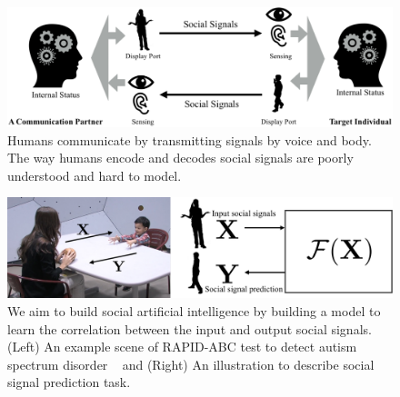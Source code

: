 %
\begin{figure}[t]
	\includegraphics[width=\linewidth]{ssp_fig/socialcomm}
	\caption{Humans communicate by transmitting signals by voice and body. The way humans encode and decodes social signals are poorly understood and hard to model. }
\label{fig:ssp_intro_flow}
\end{figure}
\begin{figure}[t]
	\centering
	\includegraphics[width=\linewidth]{ssp_fig/intro}
	\caption{We aim to build social artificial intelligence by building a model to learn the correlation between the input and output social signals. (Left) An example scene of RAPID-ABC test to detect autism spectrum disorder ~\cite{mathys2013beyond} and (Right) An illustration to describe social signal prediction task.}
	\label{fig:ssp_intro}
\end{figure}


